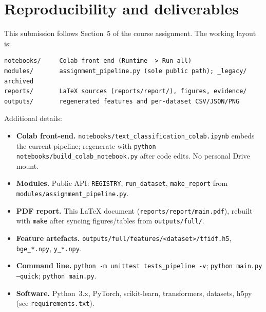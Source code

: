 \section{Reproducibility and deliverables}

This submission follows Section~5 of the course assignment. The working layout is:
\begin{verbatim}
notebooks/     Colab front end (Runtime -> Run all)
modules/       assignment_pipeline.py (sole public path); _legacy/ archived
reports/       LaTeX sources (reports/report/), figures, evidence/
outputs/       regenerated features and per-dataset CSV/JSON/PNG
\end{verbatim}

Additional details:
\begin{itemize}
  \item \textbf{Colab front-end.} \texttt{notebooks/text\_classification\_colab.ipynb} embeds the current pipeline; regenerate with \texttt{python notebooks/build\_colab\_notebook.py} after code edits. No personal Drive mount.
  \item \textbf{Modules.} Public API: \texttt{REGISTRY}, \texttt{run\_dataset}, \texttt{make\_report} from \texttt{modules/assignment\_pipeline.py}.
  \item \textbf{PDF report.} This LaTeX document (\texttt{reports/report/main.pdf}), rebuilt with \texttt{make} after syncing figures/tables from \texttt{outputs/full/}.
  \item \textbf{Feature artefacts.} \texttt{outputs/full/features/<dataset>/tfidf.h5}, \texttt{bge\_*.npy}, \texttt{y\_*.npy}.
  \item \textbf{Command line.} \texttt{python -m unittest tests\_pipeline -v}; \texttt{python main.py --quick}; \texttt{python main.py}.
  \item \textbf{Software.} Python~3.x, PyTorch, scikit-learn, transformers, datasets, h5py (see \texttt{requirements.txt}).
\end{itemize}
